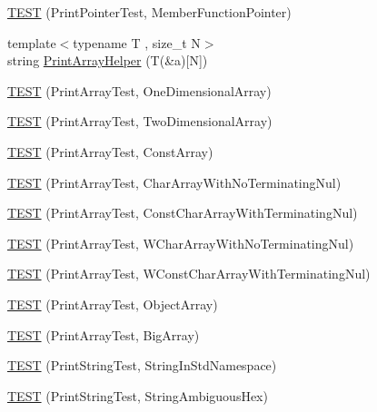 \begin{DoxyCompactItemize}
\item 
\hyperlink{namespacetesting_1_1gtest__printers__test_a9d998b210890d3d7e085d01c457f650f}{T\+E\+ST} (Print\+Pointer\+Test, Member\+Function\+Pointer)
\item 
{\footnotesize template$<$typename T , size\+\_\+t N$>$ }\\string \hyperlink{namespacetesting_1_1gtest__printers__test_a10300ded1e327c98c6a36beb7ad49e58}{Print\+Array\+Helper} (T(\&a)\mbox{[}N\mbox{]})
\item 
\hyperlink{namespacetesting_1_1gtest__printers__test_a3845c4717b03cb5ad309c7d9a37acb0a}{T\+E\+ST} (Print\+Array\+Test, One\+Dimensional\+Array)
\item 
\hyperlink{namespacetesting_1_1gtest__printers__test_ac366b9ec749b2499d21583d3b8f86273}{T\+E\+ST} (Print\+Array\+Test, Two\+Dimensional\+Array)
\item 
\hyperlink{namespacetesting_1_1gtest__printers__test_a8b5638f178c12f58707ca0f02a3b4d41}{T\+E\+ST} (Print\+Array\+Test, Const\+Array)
\item 
\hyperlink{namespacetesting_1_1gtest__printers__test_a3bae023a42049745b49fa1f2db9a0cb2}{T\+E\+ST} (Print\+Array\+Test, Char\+Array\+With\+No\+Terminating\+Nul)
\item 
\hyperlink{namespacetesting_1_1gtest__printers__test_ab51b9ecaca7d635326101b23d5e8afd2}{T\+E\+ST} (Print\+Array\+Test, Const\+Char\+Array\+With\+Terminating\+Nul)
\item 
\hyperlink{namespacetesting_1_1gtest__printers__test_ac19ec2732031bfe83b30ea9f00259ef3}{T\+E\+ST} (Print\+Array\+Test, W\+Char\+Array\+With\+No\+Terminating\+Nul)
\item 
\hyperlink{namespacetesting_1_1gtest__printers__test_a6a7cbcdbe748a1d4e90658f48f36c9da}{T\+E\+ST} (Print\+Array\+Test, W\+Const\+Char\+Array\+With\+Terminating\+Nul)
\item 
\hyperlink{namespacetesting_1_1gtest__printers__test_af91d8ad9d6c7547913fe05c7acc44114}{T\+E\+ST} (Print\+Array\+Test, Object\+Array)
\item 
\hyperlink{namespacetesting_1_1gtest__printers__test_a596493b56489aa1571fa26d1402e7116}{T\+E\+ST} (Print\+Array\+Test, Big\+Array)
\item 
\hyperlink{namespacetesting_1_1gtest__printers__test_abbd355e76033f0defd76c37523ad0f60}{T\+E\+ST} (Print\+String\+Test, String\+In\+Std\+Namespace)
\item 
\hyperlink{namespacetesting_1_1gtest__printers__test_ac20ee165500471e363011c3f664d2fb8}{T\+E\+ST} (Print\+String\+Test, String\+Ambiguous\+Hex)

\end{DoxyCompactItemize}
